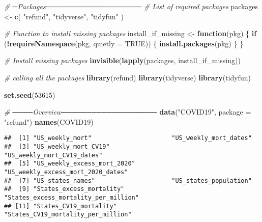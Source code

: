 \documentclass[
]{article}
\newenvironment{Shaded}{\begin{snugshade}}{\end{snugshade}}
\newcommand{\AttributeTok}[1]{\textcolor[rgb]{0.13,0.29,0.53}{#1}}
\newcommand{\CommentTok}[1]{\textcolor[rgb]{0.56,0.35,0.01}{\textit{#1}}}
\newcommand{\ConstantTok}[1]{\textcolor[rgb]{0.56,0.35,0.01}{#1}}
\newcommand{\ControlFlowTok}[1]{\textcolor[rgb]{0.13,0.29,0.53}{\textbf{#1}}}
\newcommand{\DecValTok}[1]{\textcolor[rgb]{0.00,0.00,0.81}{#1}}
\newcommand{\FunctionTok}[1]{\textcolor[rgb]{0.13,0.29,0.53}{\textbf{#1}}}
\newcommand{\NormalTok}[1]{#1}
\newcommand{\OtherTok}[1]{\textcolor[rgb]{0.56,0.35,0.01}{#1}}
\newcommand{\SpecialCharTok}[1]{\textcolor[rgb]{0.81,0.36,0.00}{\textbf{#1}}}
\newcommand{\StringTok}[1]{\textcolor[rgb]{0.31,0.60,0.02}{#1}}
\begin{document}
\begin{Shaded}
\begin{Highlighting}[]
\CommentTok{\# ─Packages───────────────────}
\CommentTok{\# List of required packages}
\NormalTok{packages }\OtherTok{\textless{}{-}} \FunctionTok{c}\NormalTok{(}
  \StringTok{"refund"}\NormalTok{,}
  \StringTok{"tidyverse"}\NormalTok{,}
  \StringTok{"tidyfun"}
\NormalTok{)}

\CommentTok{\# Function to install missing packages}
\NormalTok{install\_if\_missing }\OtherTok{\textless{}{-}} \ControlFlowTok{function}\NormalTok{(pkg) \{}
  \ControlFlowTok{if}\NormalTok{ (}\SpecialCharTok{!}\FunctionTok{requireNamespace}\NormalTok{(pkg, }\AttributeTok{quietly =} \ConstantTok{TRUE}\NormalTok{)) \{}
    \FunctionTok{install.packages}\NormalTok{(pkg)}
\NormalTok{  \}}
\NormalTok{\}}

\CommentTok{\# Install missing packages}
\FunctionTok{invisible}\NormalTok{(}\FunctionTok{lapply}\NormalTok{(packages, install\_if\_missing))}



\CommentTok{\#  calling all the packages }
\FunctionTok{library}\NormalTok{(refund)      }
\FunctionTok{library}\NormalTok{(tidyverse)   }
\FunctionTok{library}\NormalTok{(tidyfun)     }

\FunctionTok{set.seed}\NormalTok{(}\DecValTok{53615}\NormalTok{)}
\end{Highlighting}
\end{Shaded}

\begin{Shaded}
\begin{Highlighting}[]
\CommentTok{\# ────Overview───────────────────}
\FunctionTok{data}\NormalTok{(}\StringTok{"COVID19"}\NormalTok{, }\AttributeTok{package =} \StringTok{"refund"}\NormalTok{) }
\FunctionTok{names}\NormalTok{(COVID19)}
\end{Highlighting}
\end{Shaded}

\begin{verbatim}
##  [1] "US_weekly_mort"                      "US_weekly_mort_dates"               
##  [3] "US_weekly_mort_CV19"                 "US_weekly_mort_CV19_dates"          
##  [5] "US_weekly_excess_mort_2020"          "US_weekly_excess_mort_2020_dates"   
##  [7] "US_states_names"                     "US_states_population"               
##  [9] "States_excess_mortality"             "States_excess_mortality_per_million"
## [11] "States_CV19_mortality"               "States_CV19_mortality_per_million"
\end{verbatim}
\end{document}
